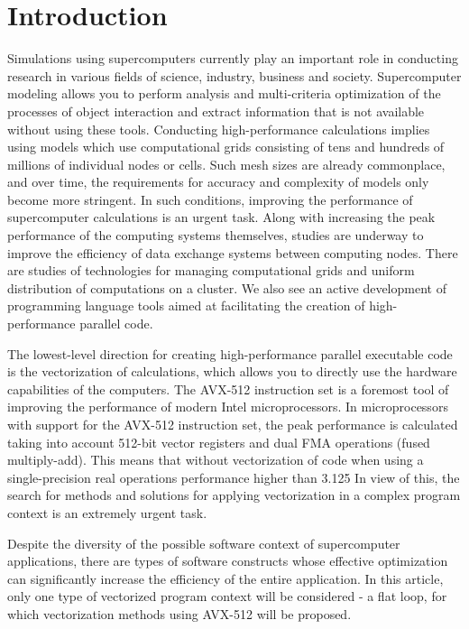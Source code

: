 \documentclass[
11pt,%
tightenlines,%
twoside,%
onecolumn,%
nofloats,%
nobibnotes,%
nofootinbib,%
superscriptaddress,%
noshowpacs,%
centertags]%
{revtex4}
\begin{document}
\maketitle

\section{Introduction}

Simulations using supercomputers currently play an important role in conducting research in various fields of science, industry, business and society.
Supercomputer modeling allows you to perform analysis and multi-criteria optimization of the processes of object interaction and extract information that is not available without using these tools.
Conducting high-performance calculations implies using models which use computational grids consisting of tens and hundreds of millions of individual nodes or cells.
Such mesh sizes are already commonplace, and over time, the requirements for accuracy and complexity of models only become more stringent.
In such conditions, improving the performance of supercomputer calculations is an urgent task.
Along with increasing the peak performance of the computing systems themselves, studies are underway to improve the efficiency of data exchange systems between computing nodes. There are studies of technologies for managing computational grids and uniform distribution of computations on a cluster. We also see an active development of programming language tools aimed at facilitating the creation of high-performance parallel code.

The lowest-level direction for creating high-performance parallel executable code is the vectorization of calculations, which allows you to directly use the hardware capabilities of the computers.
The AVX-512 instruction set is a foremost tool of improving the performance of modern Intel microprocessors.
In microprocessors with support for the AVX-512 instruction set, the peak performance is calculated taking into account 512-bit vector registers and dual FMA operations (fused multiply-add).
This means that without vectorization of code when using a single-precision real operations performance higher than 3.125%
In view of this, the search for methods and solutions for applying vectorization in a complex program context is an extremely urgent task.

Despite the diversity of the possible software context of supercomputer applications, there are types of software constructs whose effective optimization can significantly increase the efficiency of the entire application.
In this article, only one type of vectorized program context will be considered - a flat loop, for which vectorization methods using AVX-512 will be proposed.
\end{document}
